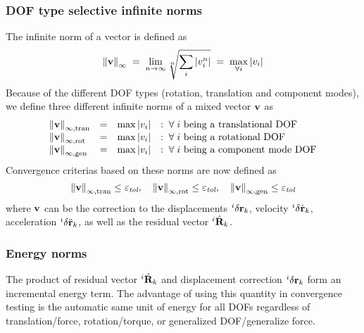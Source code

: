 \subsubsection{DOF type selective infinite norms}

The infinite norm of a vector is defined as
%
\begin{equation}
\left\|{\bf v}\right\|_{\infty} \;=\; \lim_{n\to\infty} \sqrt[n]{\sum_i |v_i^n|}
 \;=\; \max_{\forall i} |v_i|
\end{equation}
%
Because of the different DOF types (rotation, translation and component modes),
we define three different infinite norms of a mixed vector ${\bf v}$ as
%
\begin{equation}
\begin{array}{lcll}
\left\| {\bf v} \right\|_{\infty,\text{tran}} &=& \max|v_i| &
:\;\forall\; i \text{~being a translational DOF} \\
\left\| {\bf v} \right\|_{\infty,\text{rot}} &=& \max|v_i| &
:\;\forall\; i \text{~being a rotational DOF} \\
\left\| {\bf v} \right\|_{\infty,\text{gen}} &=& \max|v_i| &
:\;\forall\; i \text{~being a component mode DOF}
\end{array}
\end{equation}
%
Convergence criterias based on these norms are now defined as
%
\begin{equation}
\left\|{\bf v}\right\|_{\infty,\text{tran}} \leq \varepsilon_\textit{tol},\quad
\left\|{\bf v}\right\|_{\infty,\text{rot}} \leq \varepsilon_\textit{tol},\quad
\left\|{\bf v}\right\|_{\infty,\text{gen}} \leq \varepsilon_\textit{tol}
\end{equation}
%
where ${\bf v}$ can be the correction to the displacements ${}^{i}\delta{\bf r}_k$,
velocity ${}^{i}\delta\dot{\bf r}_k$, acceleration ${}^{i}\delta\ddot{\bf r}_k$,
as well as the residual vector ${}^{i}\hat{\bf R}_k$.

\subsubsection{Energy norms}

The product of residual vector ${}^{i}\hat{\bf R}_k$ and displacement
correction ${}^{i}\delta{\bf r}_k$ form an incremental energy term.
The advantage of using this quantity in convergence testing is the automatic
same unit of energy for all DOFs regardless of translation/force,
rotation/torque, or generalized DOF/generalize force.

